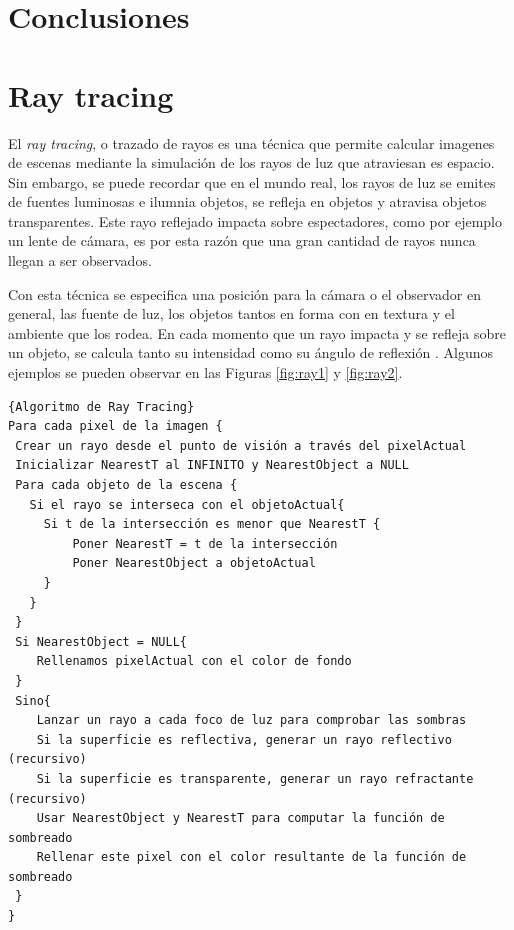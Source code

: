 \documentclass[11pt,letterpaper]{article}     %
\begin{document}
\section{Conclusiones}

\appendix
\section{Ray tracing}\label{Apendx:RayTr}
El \textit{ray tracing}, o trazado de rayos es una t\' ecnica que permite calcular imagenes de escenas mediante la simulaci\' on de los rayos de luz que atraviesan es espacio. Sin embargo, se puede recordar que en el mundo real, los rayos de luz se emites de fuentes luminosas e ilumnia objetos, se refleja en objetos y atravisa objetos transparentes. Este rayo reflejado impacta sobre espectadores, como por ejemplo un lente de c\'  amara, es por esta raz\' on que una gran cantidad de rayos nunca llegan a ser observados.

Con esta t\' ecnica se especifica una posici\'  on para la c\'  amara o el observador en general, las fuente
de luz, los objetos tantos en forma con en textura y el ambiente que los rodea. En cada momento que un rayo impacta y se refleja sobre un objeto, se calcula tanto su intensidad como su \' angulo de reflexi\'  on \cite{RayTracing}. Algunos ejemplos se pueden observar en las Figuras \ref{fig:ray1} y \ref{fig:ray2}.


\begin{verbatim}{Algoritmo de Ray Tracing}
Para cada pixel de la imagen {
 Crear un rayo desde el punto de visión a través del pixelActual
 Inicializar NearestT al INFINITO y NearestObject a NULL
 Para cada objeto de la escena {
   Si el rayo se interseca con el objetoActual{
     Si t de la intersección es menor que NearestT {
         Poner NearestT = t de la intersección
         Poner NearestObject a objetoActual
     }
   }
 }
 Si NearestObject = NULL{
    Rellenamos pixelActual con el color de fondo
 }
 Sino{
    Lanzar un rayo a cada foco de luz para comprobar las sombras
    Si la superficie es reflectiva, generar un rayo reflectivo (recursivo)
    Si la superficie es transparente, generar un rayo refractante (recursivo)
    Usar NearestObject y NearestT para computar la función de sombreado
    Rellenar este pixel con el color resultante de la función de sombreado
 }
}
\end{verbatim}
\end{document}
